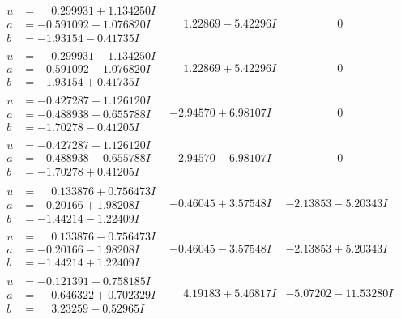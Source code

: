 \documentclass[1p]{elsarticle_modified}
\theoremstyle{definition}
\begin{document}
$$\begin{array}{c|c|c}
\begin{aligned}
u &= \phantom{-}0.299931 + 1.134250 I \\
a &= -0.591092 + 1.076820 I \\
b &= -1.93154 - 0.41735 I\end{aligned}
 & \phantom{-}1.22869 - 5.42296 I & \phantom{-0.000000 } 0 \\ \hline\begin{aligned}
u &= \phantom{-}0.299931 - 1.134250 I \\
a &= -0.591092 - 1.076820 I \\
b &= -1.93154 + 0.41735 I\end{aligned}
 & \phantom{-}1.22869 + 5.42296 I & \phantom{-0.000000 } 0 \\ \hline\begin{aligned}
u &= -0.427287 + 1.126120 I \\
a &= -0.488938 - 0.655788 I \\
b &= -1.70278 - 0.41205 I\end{aligned}
 & -2.94570 + 6.98107 I & \phantom{-0.000000 } 0 \\ \hline\begin{aligned}
u &= -0.427287 - 1.126120 I \\
a &= -0.488938 + 0.655788 I \\
b &= -1.70278 + 0.41205 I\end{aligned}
 & -2.94570 - 6.98107 I & \phantom{-0.000000 } 0 \\ \hline\begin{aligned}
u &= \phantom{-}0.133876 + 0.756473 I \\
a &= -0.20166 + 1.98208 I \\
b &= -1.44214 - 1.22409 I\end{aligned}
 & -0.46045 + 3.57548 I & -2.13853 - 5.20343 I \\ \hline\begin{aligned}
u &= \phantom{-}0.133876 - 0.756473 I \\
a &= -0.20166 - 1.98208 I \\
b &= -1.44214 + 1.22409 I\end{aligned}
 & -0.46045 - 3.57548 I & -2.13853 + 5.20343 I \\ \hline\begin{aligned}
u &= -0.121391 + 0.758185 I \\
a &= \phantom{-}0.646322 + 0.702329 I \\
b &= \phantom{-}3.23259 - 0.52965 I\end{aligned}
 & \phantom{-}4.19183 + 5.46817 I & -5.07202 - 11.53280 I \\ \hline\begin{aligned}

\end{aligned}
\end{array}$$
\end{document}
